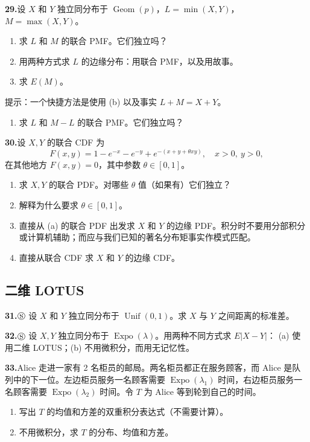 \documentclass[UTF8,12pt,a4paper,fontset=fandol]{ctexart}
\begin{document}
\noindent\textbf{29.}\quad 设 $X$ 和 $Y$ 独立同分布于 $\operatorname{Geom}(p)$，$L=\min(X,Y)$，$M=\max(X,Y)$。
\begin{enumerate}
  \item[(a)] 求 $L$ 和 $M$ 的联合 PMF。它们独立吗？
  \item[(b)] 用两种方式求 $L$ 的边缘分布：用联合 PMF，以及用故事。
  \item[(c)] 求 $E(M)$。
\end{enumerate}
提示：一个快捷方法是使用 (b) 以及事实 $L+M=X+Y$。
\begin{enumerate}
  \item[(d)] 求 $L$ 和 $M-L$ 的联合 PMF。它们独立吗？
\end{enumerate}

\noindent\textbf{30.}\quad 设 $X,Y$ 的联合 CDF 为
\[
  F(x,y)=1-e^{-x}-e^{-y}+e^{-(x+y+\theta xy)},\quad x>0,\ y>0,
\]
在其他地方 $F(x,y)=0$，其中参数 $\theta\in[0,1]$。
\begin{enumerate}
  \item[(a)] 求 $X,Y$ 的联合 PDF。对哪些 $\theta$ 值（如果有）它们独立？
  \item[(b)] 解释为什么要求 $\theta\in[0,1]$。
  \item[(c)] 直接从 (a) 的联合 PDF 出发求 $X$ 和 $Y$ 的边缘 PDF。积分时不要用分部积分或计算机辅助；而应与我们已知的著名分布矩事实作模式匹配。
  \item[(d)] 直接从联合 CDF 求 $X$ 和 $Y$ 的边缘 CDF。
\end{enumerate}

\subsection*{二维 LOTUS}

\noindent\textbf{31.}\quad $\circledS$ 设 $X$ 和 $Y$ 独立同分布于 $\operatorname{Unif}(0,1)$。求 $X$ 与 $Y$ 之间距离的标准差。

\noindent\textbf{32.}\quad $\circledS$ 设 $X,Y$ 独立同分布于 $\operatorname{Expo}(\lambda)$。用两种不同方式求 $E|X-Y|$： (a) 使用二维 LOTUS；(b) 不用微积分，而用无记忆性。

\noindent\textbf{33.}\quad Alice 走进一家有 2 名柜员的邮局。两名柜员都正在服务顾客，而 Alice 是队列中的下一位。左边柜员服务一名顾客需要 $\operatorname{Expo}(\lambda_1)$ 时间，右边柜员服务一名顾客需要 $\operatorname{Expo}(\lambda_2)$ 时间。令 $T$ 为 Alice 等到轮到自己的时间。
\begin{enumerate}
  \item[(a)] 写出 $T$ 的均值和方差的双重积分表达式（不需要计算）。
  \item[(b)] 不用微积分，求 $T$ 的分布、均值和方差。
\end{enumerate}
\end{document}
